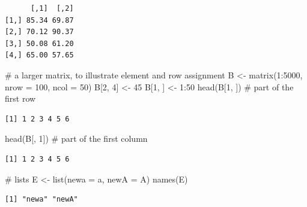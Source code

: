 \documentclass[
  letterpaper,
  DIV=11,
  numbers=noendperiod]{scrreprt}
\newenvironment{Shaded}{\begin{snugshade}}{\end{snugshade}}
\newcommand{\AttributeTok}[1]{\textcolor[rgb]{0.40,0.45,0.13}{#1}}
\newcommand{\CommentTok}[1]{\textcolor[rgb]{0.37,0.37,0.37}{#1}}
\newcommand{\DecValTok}[1]{\textcolor[rgb]{0.68,0.00,0.00}{#1}}
\newcommand{\FunctionTok}[1]{\textcolor[rgb]{0.28,0.35,0.67}{#1}}
\newcommand{\NormalTok}[1]{\textcolor[rgb]{0.00,0.23,0.31}{#1}}
\newcommand{\OtherTok}[1]{\textcolor[rgb]{0.00,0.23,0.31}{#1}}
\newcommand{\SpecialCharTok}[1]{\textcolor[rgb]{0.37,0.37,0.37}{#1}}
\renewcommand{\[}{\begin{equation}}
\renewcommand{\]}{\end{equation}}
\begin{document}
\begin{verbatim}
      [,1]  [,2]
[1,] 85.34 69.87
[2,] 70.12 90.37
[3,] 50.08 61.20
[4,] 65.00 57.65
\end{verbatim}

\begin{Shaded}
\begin{Highlighting}[]
\CommentTok{\# a larger matrix, to illustrate element and row assignment}
\NormalTok{B }\OtherTok{\textless{}{-}} \FunctionTok{matrix}\NormalTok{(}\DecValTok{1}\SpecialCharTok{:}\DecValTok{5000}\NormalTok{, }\AttributeTok{nrow =} \DecValTok{100}\NormalTok{, }\AttributeTok{ncol =} \DecValTok{50}\NormalTok{)}
\NormalTok{B[}\DecValTok{2}\NormalTok{, }\DecValTok{4}\NormalTok{] }\OtherTok{\textless{}{-}} \DecValTok{45}
\NormalTok{B[}\DecValTok{1}\NormalTok{, ] }\OtherTok{\textless{}{-}} \DecValTok{1}\SpecialCharTok{:}\DecValTok{50}
\FunctionTok{head}\NormalTok{(B[}\DecValTok{1}\NormalTok{, ])   }\CommentTok{\# part of the first row}
\end{Highlighting}
\end{Shaded}

\begin{verbatim}
[1] 1 2 3 4 5 6
\end{verbatim}

\begin{Shaded}
\begin{Highlighting}[]
\FunctionTok{head}\NormalTok{(B[, }\DecValTok{1}\NormalTok{])   }\CommentTok{\# part of the first column}
\end{Highlighting}
\end{Shaded}

\begin{verbatim}
[1] 1 2 3 4 5 6
\end{verbatim}

\begin{Shaded}
\begin{Highlighting}[]
\CommentTok{\# lists}
\NormalTok{E }\OtherTok{\textless{}{-}} \FunctionTok{list}\NormalTok{(}\AttributeTok{newa =}\NormalTok{ a, }\AttributeTok{newA =}\NormalTok{ A)}
\FunctionTok{names}\NormalTok{(E)}
\end{Highlighting}
\end{Shaded}

\begin{verbatim}
[1] "newa" "newA"
\end{verbatim}

\begin{Shaded}
\end{Shaded}
\end{document}
